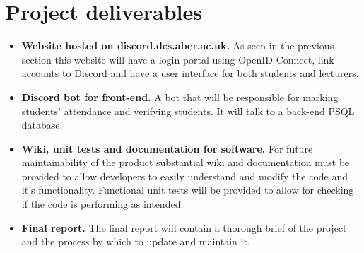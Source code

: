 \documentclass[11pt,fleqn,twoside]{article}
\begin{document}
\section{Project deliverables}
\begin{itemize}
	\item \textbf{Website hosted on discord.dcs.aber.ac.uk.} As seen in the previous section this website will have a login portal using OpenID Connect, link accounts to Discord and have a user interface for both students and lecturers.
	
	\item \textbf{Discord bot for front-end.} A bot that will be responsible for marking students' attendance and verifying students. It will talk to a back-end PSQL database.
	
	\item \textbf{Wiki, unit tests and documentation for software.} For future maintainability of the product substantial wiki and documentation must be provided to allow developers to easily understand and modify the code and it's functionality. Functional unit tests will be provided to allow for checking if the code is performing as intended.
	
	\item \textbf{Final report.} The final report will contain a thorough brief of the project and the process by which to update and maintain it.
\end{itemize}


\nocite{*} %

\newpage
{}


\renewcommand{\refname}{References}
\end{document}
